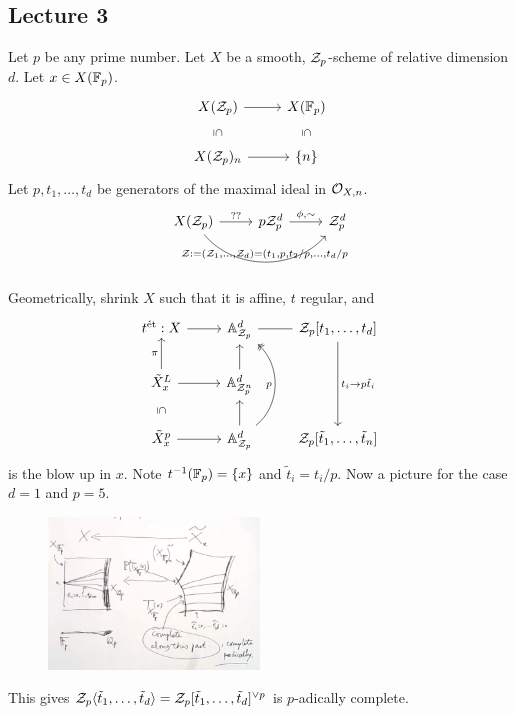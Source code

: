 \newpage
\subsection{Lecture 3}

Let $p$ be any prime number. Let $X$ be a smooth, $\mathcal{Z}_p$-scheme of relative dimension $d$. Let $x \in X(\mathbb{F}_p)$. 
	\[
	\begin{tikzcd}
	X(\Z_p) \arrow[draw=none]{d}[sloped,auto=false]{\subseteq} \arrow{r} & X(\F_p) \arrow[draw=none]{d}[sloped,auto=false]{\subseteq} \\
	X(\Z_p)_n \arrow{r} & \{n\}
	\end{tikzcd}
	\]
Let $p, t_1,\ldots,t_d$ be generators of the maximal ideal in $\mathcal{O}_{X,n}$.
	\[
	\begin{tikzcd}
	X(\Z_p) \arrow{r}{??} \arrow[bend right=50]{rr}{\Z:= (\Z_1,\ldots,\Z_d)= (t_1,p,t_2/p,\ldots,t_d/p} & p\Z_p^d \arrow{r}{\phi,\sim} & \Z_p^d
	\end{tikzcd}
	\]

Geometrically, shrink $X$ such that it is affine, $t$ regular, and 
	\[
	\begin{tikzcd}
	t^\et: X \arrow{r} & \A^d_{\Z_p} & \Z_p[t_1,\ldots,t_d] \arrow{dd}{t_i \to p \tilde{t}_i} \arrow[dash]{l} \\
	\tilde{X}_x^L \arrow{r} \arrow{u}{\pi} \arrow[draw=none]{d}[sloped,auto=false]{\subseteq} & \A^d_{\Z_p^n} \arrow{u} & \\
	\tilde{X}_x^p \arrow{r} & \A^d_{\Z_p} \arrow[bend right=50,two heads]{uu}{p}  \arrow{u} & \Z_p[\tilde{t}_1,\ldots,\tilde{t}_n]
	\end{tikzcd}
	\]
is the blow up in $x$. Note $t^{-1}(\mathbb{F}_p)= \{x\}$ and $\tilde{t}_i= t_i/p$. Now a picture for the case $d=1$ and $p=5$.


	\begin{figure}[!ht]
	\centering
	\includegraphics[width=0.5\textwidth]{../images/im31.png}
	\end{figure}

This gives $\mathcal{Z}_p\langle \tilde{t}_1,\ldots,\tilde{t}_d \rangle= \mathcal{Z}_p[ \tilde{t}_1,\ldots,\tilde{t}_d]^{\vee p}$ is $p$-adically complete. 



